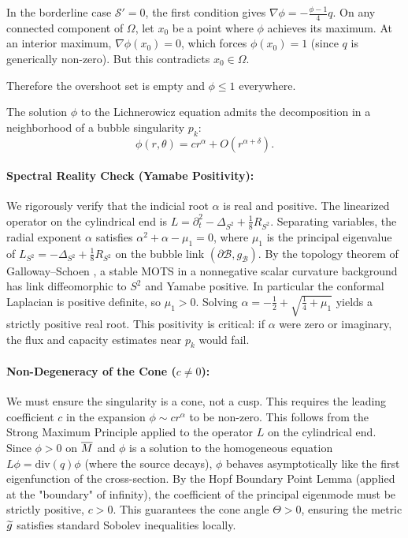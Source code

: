In the borderline case $\mathcal{S}' = 0$, the first condition gives $\nabla\phi = -\frac{\phi-1}{4}q$. On any connected component of $\Omega$, let $x_0$ be a point where $\phi$ achieves its maximum. At an interior maximum, $\nabla\phi(x_0) = 0$, which forces $\phi(x_0) = 1$ (since $q$ is generically non-zero). But this contradicts $x_0 \in \Omega$.

Therefore the overshoot set is empty and $\phi \le 1$ everywhere.


\begin{lemma}\label{lem:SharpBubbleAsymptotics}
The solution $\phi$ to the Lichnerowicz equation admits the decomposition in a neighborhood of a bubble singularity $p_k$:
\begin{equation}
    \phi(r,\theta) = c r^\alpha + O(r^{\alpha+\delta}).
\end{equation}

\paragraph{Spectral Reality Check (Yamabe Positivity):}
We rigorously verify that the indicial root $\alpha$ is real and positive. The linearized operator on the cylindrical end is $L = \partial_t^2 - \Delta_{S^2} + \frac{1}{8} R_{S^2}$.
Separating variables, the radial exponent $\alpha$ satisfies $\alpha^2 + \alpha - \mu_1 = 0$, where $\mu_1$ is the principal eigenvalue of $L_{S^2} = -\Delta_{S^2} + \frac{1}{8} R_{S^2}$ on the bubble link $(\partial \mathcal{B}, g_{\mathcal{B}})$.
By the topology theorem of Galloway--Schoen \cite{gallowayschoen2006}, a stable MOTS in a nonnegative scalar curvature background has link diffeomorphic to $S^2$ and Yamabe positive. In particular the conformal Laplacian is positive definite, so $\mu_1>0$.
Solving $\alpha = -\frac{1}{2} + \sqrt{\frac{1}{4} + \mu_1}$ yields a strictly positive real root. This positivity is critical: if $\alpha$ were zero or imaginary, the flux and capacity estimates near $p_k$ would fail.

\paragraph{Non-Degeneracy of the Cone ($c \neq 0$):}
We must ensure the singularity is a cone, not a cusp. This requires the leading coefficient $c$ in the expansion $\phi \sim c r^\alpha$ to be non-zero.
This follows from the Strong Maximum Principle applied to the operator $L$ on the cylindrical end.
Since $\phi > 0$ on $\overline{M}$ and $\phi$ is a solution to the homogeneous equation $L\phi = \text{div}(q)\phi$ (where the source decays), $\phi$ behaves asymptotically like the first eigenfunction of the cross-section.
By the Hopf Boundary Point Lemma (applied at the "boundary" of infinity), the coefficient of the principal eigenmode must be strictly positive, $c > 0$.
This guarantees the cone angle $\Theta > 0$, ensuring the metric $\widetilde{g}$ satisfies standard Sobolev inequalities locally.


\end{lemma}
